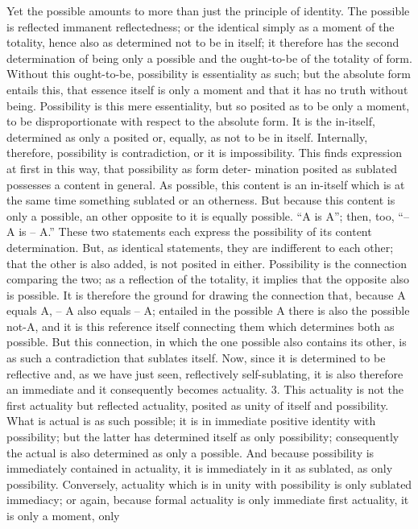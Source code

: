 Yet the possible amounts to more than just the principle of identity.
The possible is reflected immanent reflectedness; or the identical simply as a
moment of the totality, hence also as determined not to be in itself; it therefore
has the second determination of being only a possible and the ought-to-be of
the totality of form. Without this ought-to-be, possibility is essentiality as
such; but the absolute form entails this, that essence itself is only a moment
and that it has no truth without being. Possibility is this mere essentiality,
but so posited as to be only a moment, to be disproportionate with respect
to the absolute form. It is the in-itself, determined as only a posited or,
equally, as not to be in itself.
Internally, therefore, possibility is contradiction, or it is impossibility.
This finds expression at first in this way, that possibility as form deter-
mination posited as sublated possesses a content in general.
As possible, this content is an in-itself which is at the same time something sublated or an
otherness. But because this content is only a possible, an other opposite to it
is equally possible. “A is A”; then, too, “– A is – A.”
 These two statements
each express the possibility of its content determination. But, as identical
statements, they are indifferent to each other; that the other is also added,
is not posited in either. Possibility is the connection comparing the two; as
a reflection of the totality, it implies that the opposite also is possible. It is
therefore the ground for drawing the connection that, because A equals A, –
A also equals – A; entailed in the possible A there is also the possible not-A,
and it is this reference itself connecting them which determines both as
possible.
But this connection, in which the one possible also contains its other, is
as such a contradiction that sublates itself. Now, since it is determined to
be reflective and, as we have just seen, reflectively self-sublating, it is also
therefore an immediate and it consequently becomes actuality.
3. This actuality is not the first actuality but reflected actuality, posited
as unity of itself and possibility. What is actual is as such possible; it is in
immediate positive identity with possibility; but the latter has determined
itself as only possibility; consequently the actual is also determined as only a
possible. And because possibility is immediately contained in actuality, it is
immediately in it as sublated, as only possibility. Conversely, actuality which
is in unity with possibility is only sublated immediacy; or again, because
formal actuality is only immediate first actuality, it is only a moment, only
